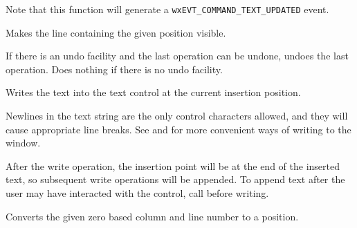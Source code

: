 Note that this function will generate a {\tt wxEVT\_COMMAND\_TEXT\_UPDATED}
event.




\label{wxtextctrlshowposition}


Makes the line containing the given position visible.




\label{wxtextctrlundo}


If there is an undo facility and the last operation can be undone, undoes the last operation. Does nothing
if there is no undo facility.


\label{wxtextctrlwritetext}


Writes the text into the text control at the current insertion position.




Newlines in the text string
are the only control characters allowed, and they will cause appropriate
line breaks.  See  and  for more convenient ways of writing to the window.

After the write operation, the insertion point will be at the end of the inserted text, so subsequent write operations will be appended. To append text after the user may have interacted with the control, call  before writing.


\label{wxtextctrlxytoposition}


Converts the given zero based column and line number to a position.

